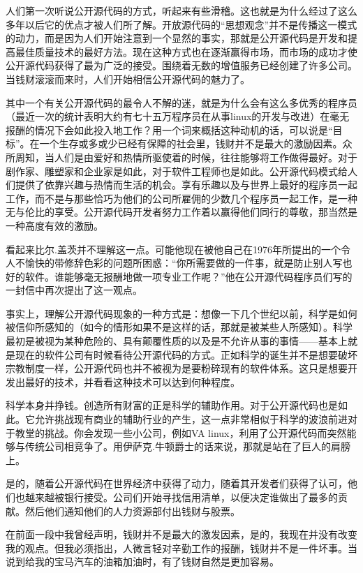 人们第一次听说公开源代码的方式，听起来有些滑稽。这也就是为什么经过了这么多年以后它的优点才被人们所了解。开放源代码的“思想观念”并不是传播这一模式的动力，而是因为人们开始注意到一个显然的事实，那就是公开源代码是开发和提高最佳质量技术的最好方法。现在这种方式也在逐渐赢得市场，而市场的成功才使公开源代码获得了最为广泛的接受。围绕着无数的增值服务已经创建了许多公司。当钱财滚滚而来时，人们开始相信公开源代码的魅力了。

其中一个有关公开源代码的最令人不解的迷，就是为什么会有这么多优秀的程序员（最近一次的统计表明大约有七十五万程序员在从事linux的开发与改进）在毫无报酬的情况下会如此投入地工作？用一个词来概括这种动机的话，可以说是“目标”。在一个生存或多或少已经有保障的社会里，钱财并不是最大的激励因素。众所周知，当人们是由爱好和热情所驱使着的时候，往往能够将工作做得最好。对于剧作家、雕塑家和企业家是如此，对于软件工程师也是如此。公开源代码模式给人们提供了依靠兴趣与热情而生活的机会。享有乐趣以及与世界上最好的程序员一起工作，而不是与那些恰巧为他们的公司所雇佣的少数几个程序员一起工作，是一种无与伦比的享受。公开源代码开发者努力工作着以赢得他们同行的尊敬，那当然是一种高度有效的激励。

看起来比尔.盖茨并不理解这一点。可能他现在被他自己在1976年所提出的一个令人不愉快的带修辞色彩的问题所困惑：“你所需要做的一件事，就是防止别人写也好的软件。谁能够毫无报酬地做一项专业工作呢？”他在公开源代码程序员们写的一封信中再次提出了这一观点。

事实上，理解公开源代码现象的一种方式是：想像一下几个世纪以前，科学是如何被信仰所感知的（如今的情形如果不是这样的话，那就是被某些人所感知）。科学最初是被视为某种危险的、具有颠覆性质的以及是不允许从事的事情——基本上就是现在的软件公司有时候看待公开源代码的方式。正如科学的诞生并不是想要破坏宗教制度一样，公开源代码也并不被视为是要粉碎现有的软件体系。这只是想要开发出最好的技术，并看看这种技术可以达到何种程度。

科学本身并挣钱。创造所有财富的正是科学的辅助作用。对于公开源代码也是如此。它允许挑战现有商业的辅助行业的产生，这一点非常相似于科学的波浪前进对于教堂的挑战。你会发现一些小公司，例如VA linux，利用了公开源代码而突然能够与传统公司相竞争了。用伊萨克.牛顿爵士的话来说，那就是站在了巨人的肩膀上。

是的，随着公开源代码在世界经济中获得了动力，随着其开发者们获得了认可，他们也越来越被银行接受。公司们开始寻找信用清单，以便决定谁做出了最多的贡献。然后他们通知他们的人力资源部付出钱财与股票。

在前面一段中我曾经声明，钱财并不是最大的激发因素，是的，我现在并没有改变我的观点。但我必须指出，人微言轻对辛勤工作的报酬，钱财并不是一件坏事。当说到给我的宝马汽车的油箱加油时，有了钱财自然是更加容易。

